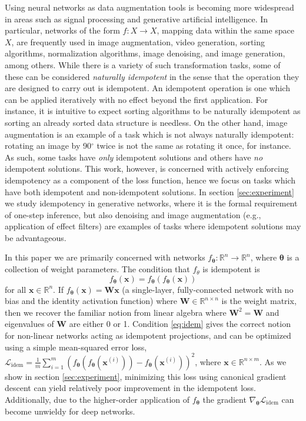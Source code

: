 \documentclass{article}
\newcommand{\vx}{\mathbf{x}}
\newcommand{\vW}{\mathbf{W}}
\newcommand{\vtheta}{\bm{\theta}}
\begin{document}
Using neural networks as data augmentation tools is becoming more widespread in areas such as signal processing and generative artificial intelligence. In particular, networks of the form ${f: X \to X}$, mapping data within the same space $X$, are frequently used in image augmentation, video generation, sorting algorithms, normalization algorithms, image denoising, and image generation, among others. While there is a variety of such transformation tasks, some of these can be considered \textit{naturally idempotent} in the sense that the operation they are designed to carry out is idempotent. An idempotent operation is one which can be applied iteratively with no effect beyond the first application. For instance, it is intuitive to expect sorting algorithms to be naturally idempotent as sorting an already sorted data structure is needless. On the other hand, image augmentation is an example of a task which is not always naturally idempotent: rotating an image by 90$^{\circ}$ twice is not the same as rotating it once, for instance. As such, some tasks have \textit{only} idempotent solutions and others have \textit{no} idempotent solutions. This work, however, is concerned with actively enforcing idempotency as a component of the loss function, hence we focus on tasks which have both idempotent and non-idempotent solutions. In section \ref{sec:experiment} we study idempotency in generative networks, where it is the formal requirement of one-step inference, but also denoising and image augmentation (e.g., application of effect filters) are examples of tasks where idempotent solutions may be advantageous.

In this paper we are primarily concerned with networks $f_{\vtheta}: \mathbb{R}^n \to \mathbb{R}^n$, where $\vtheta$ is a collection of weight parameters. The condition that $f_{\theta}$ is idempotent is
%
\begin{equation}
  f_{\vtheta}(\vx) = f_{\vtheta}(f_{\vtheta}(\vx))
  \label{eq:idem}
\end{equation}
%
for all $\vx \in \mathbb{R}^n$. If $f_{\vtheta}(\vx) = \vW \vx$ (a single-layer, fully-connected network with no bias and the identity activation function) where $\vW \in \mathbb{R}^{n \times n}$ is the weight matrix, then we recover the familiar notion from linear algebra where $\vW^2 = \vW$ and eigenvalues of $\vW$ are either 0 or 1. Condition \ref{eq:idem} gives the correct notion for non-linear networks acting as idempotent projections, and can be optimized using a simple mean-squared error loss, $\mathcal{L}_\text{idem} = \frac{1}{m} \sum_{i = 1}^m (f_{\vtheta}(f_{\vtheta}(\vx^{(i)})) - f_{\vtheta}(\vx^{(i)}))^2$, where $\vx \in \mathbb{R}^{n \times m}$. As we show in section \ref{sec:experiment}, minimizing this loss using canonical gradient descent can yield relatively poor improvement in the idempotent loss. Additionally, due to the higher-order application of $f_{\vtheta}$ the gradient $\nabla_{\vtheta} \mathcal{L}_{\text{idem}}$ can become unwieldy for deep networks.
\end{document}
